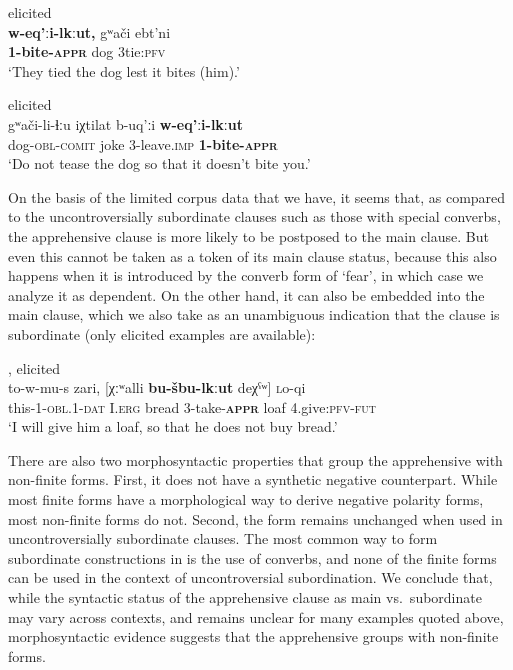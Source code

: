 \documentclass[output=paper,colorlinks,citecolor=brown]{langscibook}
\begin{document}
\ea \label{ex:DD30} \textnormal{elicited} \\
\gll \textbf{w-eq'ːi-lkːut,} gʷači   e{\textlangle}b{\textrangle}t'ni \\
\textbf{1-bite-\textsc{appr}} dog {\textlangle}3{\textrangle}tie:\textsc{pfv} \\
\glt `They tied the dog lest it bites (him).'
\z


\ea \label{ex:DD31} \textnormal{elicited} \\
\gll gʷači-li-ɬːu iχtilat b-uq'ːi \textbf{w-eq'ːi-lkːut} \\
dog-\textsc{obl-comit} joke 3-leave.\textsc{imp} \textbf{1-bite-\textsc{appr}} \\
\glt `Do not tease the dog so that it doesn't bite you.'
\z


On the basis of the limited corpus data that we have, it seems that, as compared to the uncontroversially subordinate clauses such as those with special converbs, the apprehensive clause is more likely to be postposed to the main clause. But even this cannot be taken as a token of its main clause status, because this also happens when it is introduced by the converb form of `fear', in which case we analyze it as dependent. On the other hand, it can also be embedded into the main clause, which we also take as an unambiguous indication that the clause is subordinate (only elicited examples are available):

\ea \label{ex:DD32} \textnormal{\citet[292]{Kibrik1977}, elicited} \\
\gll to-w-mu-s zari, \textup{[}χːʷalli \textbf{bu-šbu-lkːut} deχˁʷ\textup{]} \textsc{l}o-qi \\
this-1-\textsc{obl.1-dat} I.\textsc{erg} bread 3-take-\textbf{\textsc{appr}} loaf 4.give:\textsc{pfv-fut} \\
\glt `I will give him a loaf, so that he does not buy bread.' \\ 
\z

There are also two morphosyntactic properties that group the apprehensive with non-finite forms. First, it does not have a synthetic negative counterpart. While most finite forms have a morphological way to derive negative polarity forms, most non-finite forms do not. Second, the form remains unchanged when used in uncontroversially subordinate clauses. The most common way to form subordinate constructions in  is the use of converbs, and none of the finite forms can be used in the context of uncontroversial subordination. We conclude that, while the syntactic status of the apprehensive clause as main vs.\ subordinate may vary across contexts, and remains unclear for many examples quoted above, morphosyntactic evidence suggests that the apprehensive groups with non-finite forms. 
\end{document}
